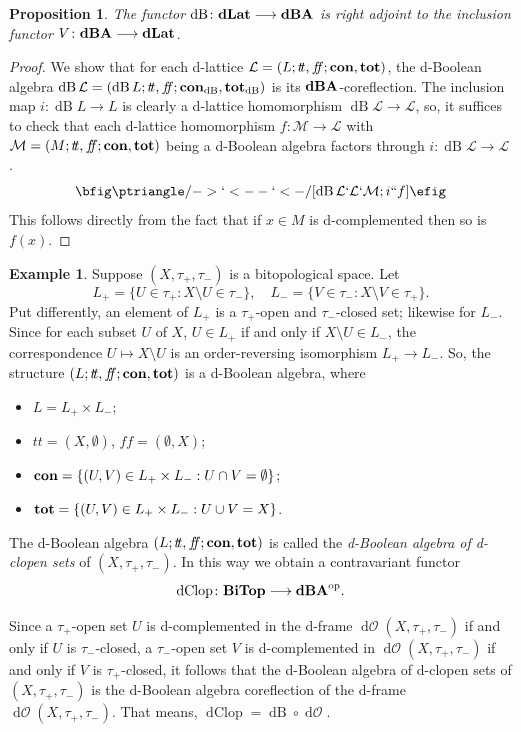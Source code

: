 \documentclass[11pt]{article}
\DeclareMathOperator{\dB}{dB}
\DeclareMathOperator{\dClop}{dClop}
\DeclareMathOperator{\dO}{d\mathcal{O}}
\theoremstyle{plain}
\newtheorem{prop}[thm]{Proposition}
\theoremstyle{definition}
\newtheorem{exmp}[thm]{Example}
\newcommand{\dbt}{{t\!t}}
\newcommand{\dbf}{{f\!\!f}}
\newcommand{\dLat}{\bf dLat}
\newcommand{\dBoo}{\bf dBA}
\newcommand{\lra}{\longrightarrow}
\begin{document}
\begin{prop} The functor $\dB\colon \dLat \longrightarrow \dBoo$ is right adjoint to the inclusion functor $V\colon \dBoo\longrightarrow\dLat$. 
\end{prop}

\begin{proof} We show that for each  d-lattice  $\mathcal{L}=(L;\dbt,\dbf;{\bf con},{\bf tot})$, the d-Boolean algebra  $\dB\mathcal{L}=(\dB L;\dbt,\dbf;{\bf con}_{\dB},{\bf tot}_{\dB})$ is its $\dBoo$-coreflection. The inclusion map $i\colon \dB L\lra L$ is clearly a d-lattice homomorphism $\dB\mathcal{L}\lra\mathcal{L}$, so, it suffices to check that each d-lattice homomorphism $f\colon \mathcal{M}\lra\mathcal{L}$ with $\mathcal{M}= (M;\dbt,\dbf;{\bf con},{\bf tot})$ being a d-Boolean algebra factors through  $i\colon\dB\mathcal{L}\lra\mathcal{L}$. $$\bfig\ptriangle/->`<--`<-/[\dB\mathcal{L}`\mathcal{L}`\mathcal{M};i` `f]\efig$$
This follows directly from the fact that  
if $x\in M$ is d-complemented then so is $f(x)$. \end{proof}

\begin{exmp}
Suppose $(X, \tau_+, \tau_-)$ is a bitopological space. Let  $$L_+=\{U\in\tau_+: X\setminus U\in\tau_-\},\quad L_-=\{V\in\tau_-: X\setminus V\in\tau_+\}.$$ Put differently, an element of $L_+$ is a $\tau_+$-open and $\tau_-$-closed set; likewise for $L_-$. Since for each subset $U$ of $X$, $ U\in L_+$ if and only if $X\setminus U\in L_-$,   the correspondence $U\mapsto X\setminus U$ is an order-reversing isomorphism   $L_+\lra L_-$. So,  the structure $(L;\dbt,\dbf;{\bf con},{\bf tot})$  is a d-Boolean algebra, where  \begin{itemize}\setlength{\itemsep}{0pt}
\item $L=L_+\times L_-$; \item $\dbt=(X,\emptyset)$, $\dbf=(\emptyset,X)$; \item ${\bf con}=\{(U,V)\in L_+\times L_-: U\cap V=\emptyset\}$;   \item ${\bf tot}=\{(U,V)\in L_+\times L_-: U\cup V=X\}$. \end{itemize}  
The d-Boolean algebra $(L;\dbt,\dbf;{\bf con},{\bf tot})$  is called the \emph{d-Boolean algebra of d-clopen sets} of $(X, \tau_+, \tau_-)$. In this way we obtain a contravariant functor  $$\dClop\colon{\bf BiTop}\longrightarrow{\bf dBA}^{\rm op}.$$   

Since a $\tau_+$-open set $U$ is d-complemented in the d-frame  $\dO(X, \tau_+, \tau_-)$   if and only if $U$ is $\tau_-$-closed, a $\tau_-$-open set $V$ is d-complemented in   $\dO(X, \tau_+, \tau_-)$  if and only if $V$ is $\tau_+$-closed, it follows that the d-Boolean algebra of d-clopen sets of $(X,\tau_+,\tau_-)$ is the d-Boolean algebra coreflection of the d-frame $\dO (X,\tau_+,\tau_-)$. That means, $\dClop=\dB\circ\dO.$    \end{exmp}
 
\end{document}
